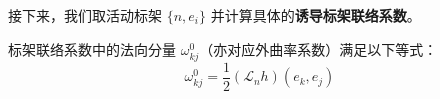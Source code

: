接下来，我们取活动标架 $\{n, e_i\}$ 并计算具体的\textbf{诱导标架联络系数}。

\begin{theorem}[法向联络分量与李导数关系]
    标架联络系数中的法向分量 $\omega^0_{kj}$（亦对应外曲率系数）满足以下等式：
    \begin{equation}
        \omega^0_{kj} = \frac{1}{2} (\mathcal{L}_n h)(e_k, e_j)
    \end{equation}
\end{theorem}


